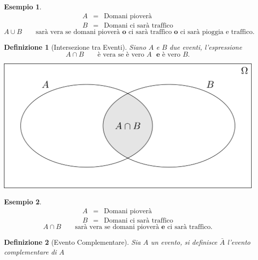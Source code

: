\documentclass[
  11pt,
]{book}
\theoremstyle{mytheoremstyle}
\theoremstyle{mydefstyle}
\newtheorem{definition}{Definizione}[section]
\newtheorem{example}{{Esempio}}[section]
\begin{document}
\begin{example}
\begin{eqnarray*}
    A&=&  \text{Domani pioverà}\\
    B&=&  \text{Domani ci sarà traffico}
\end{eqnarray*}
\[
A\cup B\qquad\text{sarà vera se domani pioverà }\textbf{o}\text{ ci sarà traffico }\textbf{o}\text{ ci sarà pioggia e traffico.}
\]
\end{example}

\begin{info}

\begin{definition}[Intersezione tra Eventi]
Siano \(A\) e \(B\) due eventi, l'espressione
\[
A\cap B\qquad\text{è vera se è vero $A$ }\textbf{e}\text{  è vero $B$.}
\]
\end{definition}

\end{info}

\begin{center}\includegraphics[width=41.67in,height=0.2\textheight,]{img/intersezione} \end{center}

\begin{example}
\begin{eqnarray*}
    A&=&  \text{Domani pioverà}\\
    B&=&  \text{Domani ci sarà traffico}
\end{eqnarray*}
\[
A\cap B\qquad\text{sarà vera se domani pioverà }\textbf{e}\text{ ci sarà traffico.}
\]
\end{example}

\begin{info}

\begin{definition}[Evento Complementare]
Sia \(A\) un evento, si definisce \(\bar A\) l'evento complementare di \(A\)
\end{definition}

\end{info}
\end{document}
